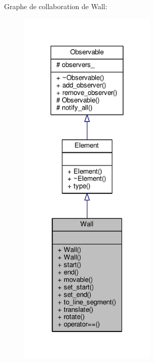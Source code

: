 Graphe de collaboration de Wall\+:
\nopagebreak
\begin{figure}[H]
\begin{center}
\leavevmode
\includegraphics[width=186pt]{d9/d82/classWall__coll__graph}
\end{center}
\end{figure}
